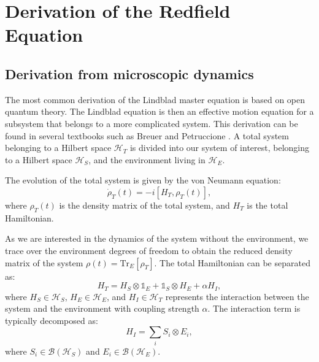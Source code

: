 
\chapter{Derivation of the Redfield Equation} %

\label{Chapter:Derivation_Redfield_Equation} %


\section{Derivation from microscopic dynamics}
\label{sec:Derivation_redfield_eq_from_microscopic_dynamics}

The most common derivation of the Lindblad master equation is based on open quantum theory. 
The Lindblad equation is then an effective motion equation for a subsystem that belongs to a more complicated system. 
This derivation can be found in several textbooks such as Breuer and Petruccione \cite{breuer_theory_2009}. 
A total system belonging to a Hilbert space $\mathcal{H}_T$ is divided into our system of interest, belonging to a Hilbert space $\mathcal{H}_S$, and the environment living in $\mathcal{H}_E$.

The evolution of the total system is given by the von Neumann equation:
\begin{equation}
    \dot{\rho}_T(t) = -i[H_T, \rho_T(t)],
    \label{eq:Von_Neumann_Equation}
\end{equation}
where $\rho_T(t)$ is the density matrix of the total system, and $H_T$ is the total Hamiltonian.

As we are interested in the dynamics of the system without the environment, we trace over the environment degrees of freedom to obtain the reduced density matrix of the system $\rho(t) = \mathrm{Tr}_E[\rho_T]$. The total Hamiltonian can be separated as:
\begin{equation}
    H_T = H_S \otimes \mathbb{1}_E + \mathbb{1}_S \otimes H_E + \alpha H_I,
    \label{eq:Total_Hamiltonian}
\end{equation}
where $H_S \in \mathcal{H}_S$, $H_E \in \mathcal{H}_E$, and $H_I \in \mathcal{H}_T$ represents the interaction between the system and the environment with coupling strength $\alpha$. The interaction term is typically decomposed as:
\begin{equation}
    H_I = \sum_i S_i \otimes E_i,
    \label{eq:Interaction_Hamiltonian}
\end{equation}
where $S_i \in \mathcal{B}(\mathcal{H}_S)$ and $E_i \in \mathcal{B}(\mathcal{H}_E)$.

